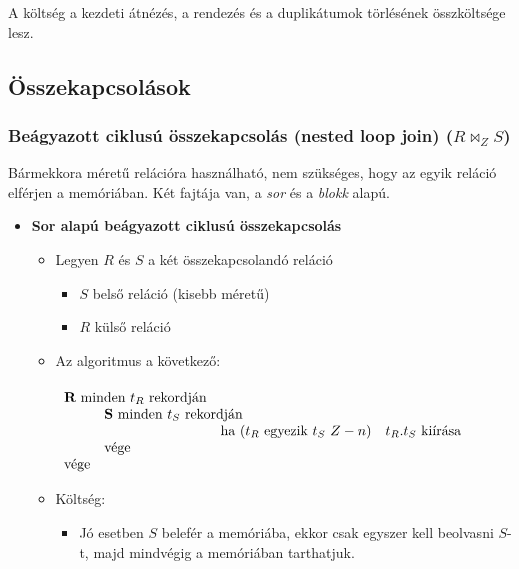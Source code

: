 \documentclass[12pt,margin=0px]{article}
\begin{document}
	\noindent A költség a kezdeti átnézés, a rendezés és a duplikátumok törlésének összköltsége lesz.

	\subsection*{Összekapcsolások}
	
	\subsubsection*{Beágyazott ciklusú összekapcsolás (nested loop join) ($R \bowtie_{Z} S$)}
        Bármekkora méretű relációra használható, nem szükséges, hogy az egyik reláció elférjen a memóriában. Két fajtája van, a \emph{sor} és a \emph{blokk} alapú.
		\begin{itemize}
			\item	\textbf{Sor alapú beágyazott ciklusú összekapcsolás}
            \begin{itemize}
            \item Legyen $R$ és $S$ a két összekapcsolandó reláció
            \begin{itemize}
                \item $S$ belső reláció (kisebb méretű)
                \item $R$ külső reláció
            \end{itemize}
            \item Az algoritmus a következő: \\\\
                {\small
                $\begin{array}{llll}
                   \multicolumn{2}{l}{\textbf{R}\ \text{minden}\ t_{R}\ \text{rekordján}} & &  \\
                   & \multicolumn{2}{l}{\textbf{S}\ \text{minden}\ t_{S}\ \text{rekordján}} & \\
                   & & \multicolumn{2}{l}{\text{ha}\ (t_{R}\ \text{egyezik}\ t_{S}\ Z-n)\quad t_{R}.t_{S}\ \text{kiírása}} \\
                   & \text{vége} & &  \\
                  \text{vége} & & & \\
                \end{array}$}\\
            \item Költség:
                \begin{itemize}
                    \item Jó esetben $S$ belefér a memóriába, ekkor csak egyszer kell beolvasni $S$-t, majd mindvégig a memóriában tarthatjuk.\\

\end{itemize}
\end{itemize}
\end{itemize}
\end{document}
